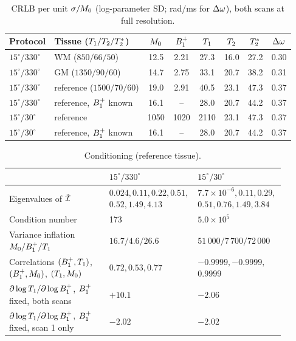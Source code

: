 \begin{table}[!htbp]
\centering
\caption{CRLB per unit $\sigma/M_0$ (log-parameter SD; rad/ms for $\Delta\omega$), both scans at full
resolution.}
\label{tab:crlb}
\small
\begin{tabular}{llcccccc}
\toprule
Protocol & Tissue ($T_1/T_2/T_2^{*}$) & $M_0$ & $B_1^{+}$ & $T_1$ & $T_2$ & $T_2^{*}$ & $\Delta\omega$\\
\midrule
$15^\circ/330^\circ$ & WM ($850/66/50$) & 12.5 & 2.21 & 27.3 & 16.0 & 27.2 & 0.30\\
$15^\circ/330^\circ$ & GM ($1350/90/60$) & 14.7 & 2.75 & 33.1 & 20.7 & 38.2 & 0.31\\
$15^\circ/330^\circ$ & reference ($1500/70/60$) & 19.0 & 2.91 & 40.5 & 23.1 & 47.3 & 0.37\\
$15^\circ/330^\circ$ & reference, $B_1^{+}$ known & 16.1 & -- & 28.0 & 20.7 & 44.2 & 0.37\\
$15^\circ/30^\circ$ & reference & 1050 & 1020 & 2110 & 23.1 & 47.3 & 0.37\\
$15^\circ/30^\circ$ & reference, $B_1^{+}$ known & 16.1 & -- & 28.0 & 20.7 & 44.2 & 0.37\\
\bottomrule
\end{tabular}
\end{table}

\begin{table}[!htbp]
\centering
\caption{Conditioning (reference tissue).}
\label{tab:cond}
\small
\begin{tabular}{p{0.42\linewidth}p{0.22\linewidth}p{0.26\linewidth}}
\toprule
 & $15^\circ/330^\circ$ & $15^\circ/30^\circ$\\
\midrule
Eigenvalues of $\tilde{\mathcal{I}}$ & $0.024,0.11,0.22,0.51,$ $0.52,1.49,4.13$ & $7.7{\times}10^{-6},0.11,0.29,$ $0.51,0.76,1.49,3.84$\\
Condition number & 173 & $5.0\times10^5$\\
Variance inflation $M_0/B_1^{+}/T_1$ & $16.7/4.6/26.6$ & $51\,000/7\,700/72\,000$\\
Correlations $(B_1^{+},T_1)$, $(B_1^{+},M_0)$, $(T_1,M_0)$ & $0.72,0.53,0.77$ & $-0.9999,-0.9999,$ $0.9999$\\
$\partial\log T_1/\partial\log B_1^{+}$, $B_1^{+}$ fixed, both scans & $+10.1$ & $-2.06$\\
$\partial\log T_1/\partial\log B_1^{+}$, $B_1^{+}$ fixed, scan 1 only & $-2.02$ & $-2.02$\\
\bottomrule
\end{tabular}
\end{table}

